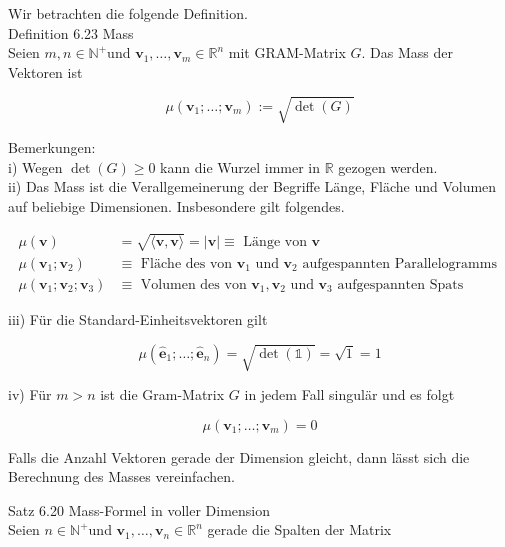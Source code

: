 \documentclass[10pt]{article}
\begin{document}
Wir betrachten die folgende Definition.\\
Definition 6.23 Mass\\
Seien $m, n \in \mathbb{N}^{+}$und $\mathbf{v}_{1}, \ldots, \mathbf{v}_{m} \in \mathbb{R}^{n}$ mit GRAM-Matrix $G$. Das Mass der Vektoren ist


\begin{equation*}
\mu\left(\mathbf{v}_{1} ; \ldots ; \mathbf{v}_{m}\right):=\sqrt{\operatorname{det}(G)} \tag{6.140}
\end{equation*}


Bemerkungen:\\
i) Wegen $\operatorname{det}(G) \geq 0$ kann die Wurzel immer in $\mathbb{R}$ gezogen werden.\\
ii) Das Mass ist die Verallgemeinerung der Begriffe Länge, Fläche und Volumen auf beliebige Dimensionen. Insbesondere gilt folgendes.


\begin{align*}
\mu(\mathbf{v}) & =\sqrt{\langle\mathbf{v}, \mathbf{v}\rangle}=|\mathbf{v}| \equiv \text { Länge von } \mathbf{v}  \tag{6.141}\\
\mu\left(\mathbf{v}_{1} ; \mathbf{v}_{2}\right) & \equiv \text { Fläche des von } \mathbf{v}_{1} \text { und } \mathbf{v}_{2} \text { aufgespannten Parallelogramms }  \tag{6.142}\\
\mu\left(\mathbf{v}_{1} ; \mathbf{v}_{2} ; \mathbf{v}_{3}\right) & \equiv \text { Volumen des von } \mathbf{v}_{1}, \mathbf{v}_{2} \text { und } \mathbf{v}_{3} \text { aufgespannten Spats } \tag{6.143}
\end{align*}


iii) Für die Standard-Einheitsvektoren gilt


\begin{equation*}
\mu\left(\hat{\mathbf{e}}_{1} ; \ldots ; \hat{\mathbf{e}}_{n}\right)=\sqrt{\operatorname{det}(\mathbb{1})}=\sqrt{1}=1 \tag{6.144}
\end{equation*}


iv) Für $m>n$ ist die Gram-Matrix $G$ in jedem Fall singulär und es folgt


\begin{equation*}
\mu\left(\mathbf{v}_{1} ; \ldots ; \mathbf{v}_{m}\right)=0 \tag{6.145}
\end{equation*}


Falls die Anzahl Vektoren gerade der Dimension gleicht, dann lässt sich die Berechnung des Masses vereinfachen.

Satz 6.20 Mass-Formel in voller Dimension\\
Seien $n \in \mathbb{N}^{+}$und $\mathbf{v}_{1}, \ldots, \mathbf{v}_{n} \in \mathbb{R}^{n}$ gerade die Spalten der Matrix
\end{document}
